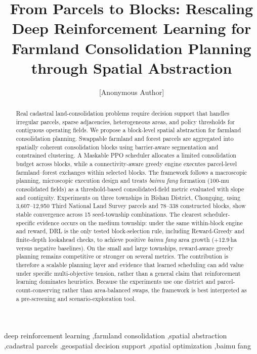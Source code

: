\documentclass[preprint,12pt]{elsarticle}
\begin{document}
\begin{frontmatter}

\title{From Parcels to Blocks: Rescaling Deep Reinforcement Learning for Farmland Consolidation Planning through Spatial Abstraction}

\author[anon]{[Anonymous Author]}


\begin{abstract}
Real cadastral land-consolidation problems require decision support that handles irregular parcels, sparse adjacencies, heterogeneous areas, and policy thresholds for contiguous operating fields. We propose a block-level spatial abstraction for farmland consolidation planning. Swappable farmland and forest parcels are aggregated into spatially coherent consolidation blocks using barrier-aware segmentation and constrained clustering. A Maskable PPO scheduler allocates a limited consolidation budget across blocks, while a connectivity-aware greedy engine executes parcel-level farmland--forest exchanges within selected blocks. The framework follows a macroscopic planning, microscopic execution design and treats \textit{baimu fang} formation (100-mu consolidated fields) as a threshold-based consolidated-field metric evaluated with slope and contiguity. Experiments on three townships in Bishan District, Chongqing, using 3,607--12,950 Third National Land Survey parcels and 78--338 constructed blocks, show stable convergence across 15 seed-township combinations. The clearest scheduler-specific evidence occurs on the medium township: under the same within-block engine and reward, DRL is the only tested block-selection rule, including Reward-Greedy and finite-depth lookahead checks, to achieve positive \textit{baimu fang} area growth ($+12.9$\,ha versus negative baselines). On the small and large townships, reward-aware greedy planning remains competitive or stronger on several metrics. The contribution is therefore a scalable planning layer and evidence that learned scheduling can add value under specific multi-objective tension, rather than a general claim that reinforcement learning dominates heuristics. Because the experiments use one district and parcel-count-conserving rather than area-balanced swaps, the framework is best interpreted as a pre-screening and scenario-exploration tool.
\end{abstract}

\begin{keyword}
deep reinforcement learning \sep farmland consolidation \sep spatial abstraction \sep cadastral parcels \sep geospatial decision support \sep spatial optimization \sep baimu fang
\end{keyword}

\end{frontmatter}
\end{document}
